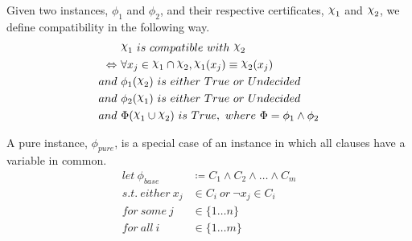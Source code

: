 \begin{definition}[Compatibility]
\label{def:compatibility}
    Given two instances, $\phi_1$ and $\phi_2$, and their respective certificates, $\rchi_1$ and $\rchi_2$, we define compatibility in the following way.
    \begin{align*}
        & \rchi_1~ is~ compatible~ with~ \rchi_2 \\
        \Leftrightarrow~ & \forall x_j \in \rchi_1 \cap \rchi_2, \rchi_1(x_j) \equiv \rchi_2(x_j) \\
        and~ & \phi_1(\rchi_2)~ is~ either~ True~ or~ Undecided \\
        and~ & \phi_2(\rchi_1)~ is~ either~ True~ or~ Undecided \\
        and~ & \Phi(\rchi_1 \cup \rchi_2)~ is~ True,~ where~ \Phi = \phi_1 \land \phi_2
    \end{align*}
\end{definition}

\begin{definition}
    \label{def:pure-instance}
    A pure instance, $\phi_{pure}$, is a special case of an instance in which all clauses have a variable in common.
    \begin{align*}
        let~ \phi_{base} & \coloneqq C_1 \land C_2 \land \ldots \land C_m \\
        s.t.~ either~ x_j & \in C_i~ or~ \lnot x_j \in C_i \\
        for~ some~ j & \in \{ 1 \dots n \} \\
        for~ all~ i & \in \{ 1 \dots m \}
    \end{align*}
\end{definition}

